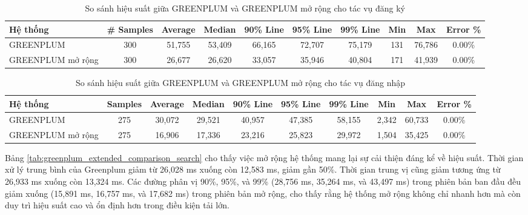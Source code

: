 \documentclass{article}[14pt]
\begin{document}
\begin{table}[htbp]
\centering
\renewcommand{\arraystretch}{1.2} %
\setlength{\tabcolsep}{2pt} %
\begin{tabular}{|l|c|c|c|c|c|c|c|c|c|}
\hline
\textbf{Hệ thống} & \textbf{\# Samples} & \textbf{Average} & \textbf{Median} & \textbf{90\% Line} & \textbf{95\% Line} & \textbf{99\% Line} & \textbf{Min} & \textbf{Max} & \textbf{Error \%} \\ \hline
GREENPLUM & 300 & 51,755 & 53,409 & 66,165 & 72,707 & 75,179 & 131 & 76,786 & 0.00\% \\ \hline
GREENPLUM mở rộng & 300 & 26,677 & 26,620 & 33,057 & 35,946 & 40,804 & 171 & 41,939 & 0.00\% \\ \hline
\end{tabular}
\caption{So sánh hiệu suất giữa GREENPLUM và GREENPLUM mở rộng cho tác vụ đăng ký}
\label{tab:greenplum_extended_comparison_registation}
\end{table}

\begin{table}[htbp]
\centering
\renewcommand{\arraystretch}{1.2} %
\setlength{\tabcolsep}{3.5pt} %
\begin{tabular}{|l|c|c|c|c|c|c|c|c|c|}
\hline
\textbf{Hệ thống} & \textbf{Samples} & \textbf{Average} & \textbf{Median} & \textbf{90\% Line} & \textbf{95\% Line} & \textbf{99\% Line} & \textbf{Min} & \textbf{Max} & \textbf{Error \%} \\ \hline
GREENPLUM & 275 & 30,072 & 29,521 & 40,957 & 47,385 & 58,155 & 2,342 & 60,733 & 0.00\% \\ \hline
GREENPLUM mở rộng & 275 & 16,906 & 17,336 & 23,216 & 25,823 & 29,972 & 1,504 & 35,425 & 0.00\% \\ \hline
\end{tabular}
\caption{So sánh hiệu suất giữa GREENPLUM và GREENPLUM mở rộng cho tác vụ đăng nhập}
\label{tab:greenplum_extended_comparison_login}
\end{table}



Bảng \ref{tab:greenplum_extended_comparison_search} cho thấy việc mở rộng hệ thống mang lại sự cải thiện đáng kể về hiệu suất. Thời gian xử lý trung bình của Greenplum giảm từ 26,028 ms xuống còn 12,583 ms, giảm gần 50\%. Thời gian trung vị cũng giảm tương ứng từ 26,933 ms xuống còn 13,324 ms. Các đường phân vị 90\%, 95\%, và 99\% (28,756 ms, 35,264 ms, và 43,497 ms) trong phiên bản ban đầu đều giảm xuống (15,891 ms, 16,757 ms, và 17,682 ms) trong phiên bản mở rộng, cho thấy rằng hệ thống mở rộng không chỉ nhanh hơn mà còn duy trì hiệu suất cao và ổn định hơn trong điều kiện tải lớn.
\end{document}
